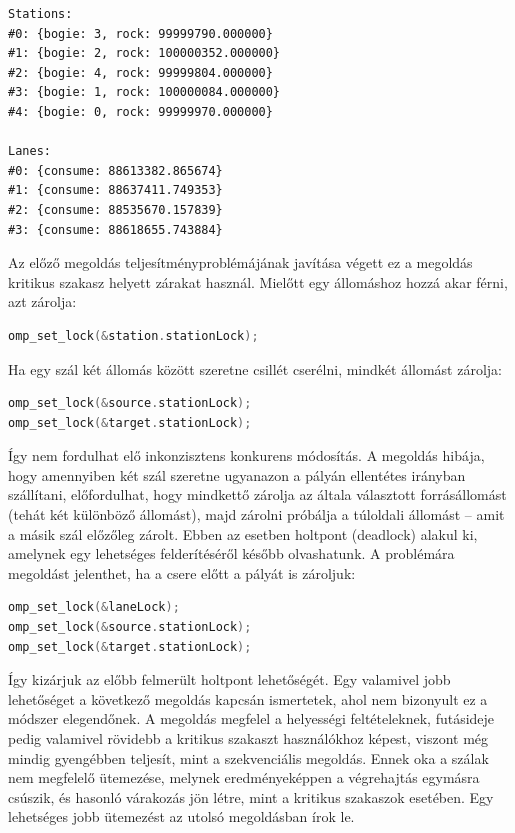 \documentclass[a4paper,10pt]{article}
\begin{document}
\begin{lstlisting}
Stations:
#0: {bogie: 3, rock: 99999790.000000}
#1: {bogie: 2, rock: 100000352.000000}
#2: {bogie: 4, rock: 99999804.000000}
#3: {bogie: 1, rock: 100000084.000000}
#4: {bogie: 0, rock: 99999970.000000}

Lanes:
#0: {consume: 88613382.865674}
#1: {consume: 88637411.749353}
#2: {consume: 88535670.157839}
#3: {consume: 88618655.743884}
\end{lstlisting}

Az előző megoldás teljesítményproblémájának javítása végett ez a megoldás kritikus szakasz helyett zárakat használ. Mielőtt egy állomáshoz hozzá akar férni, azt zárolja:

\begin{lstlisting}[language=c]
omp_set_lock(&station.stationLock);
\end{lstlisting}

Ha egy szál két állomás között szeretne csillét cserélni, mindkét állomást zárolja:

\begin{lstlisting}[language=c]
omp_set_lock(&source.stationLock);
omp_set_lock(&target.stationLock);
\end{lstlisting}

Így nem fordulhat elő inkonzisztens konkurens módosítás. A megoldás hibája, hogy amennyiben két szál szeretne ugyanazon a pályán ellentétes irányban szállítani, előfordulhat, hogy mindkettő zárolja az általa választott forrásállomást (tehát két különböző állomást), majd zárolni próbálja a túloldali állomást -- amit a másik szál előzőleg zárolt. Ebben az esetben holtpont (deadlock) alakul ki, amelynek egy lehetséges felderítéséről később olvashatunk. A problémára megoldást jelenthet, ha a csere előtt a pályát is zároljuk:

\begin{lstlisting}[language=c]
omp_set_lock(&laneLock);
omp_set_lock(&source.stationLock);
omp_set_lock(&target.stationLock);
\end{lstlisting}

Így kizárjuk az előbb felmerült holtpont lehetőségét. Egy valamivel jobb lehetőséget a következő megoldás kapcsán ismertetek, ahol nem bizonyult ez a módszer elegendőnek.
A megoldás megfelel a helyességi feltételeknek, futásideje pedig valamivel rövidebb a kritikus szakaszt használókhoz képest, viszont még mindig gyengébben teljesít, mint a szekvenciális megoldás. Ennek oka a szálak nem megfelelő ütemezése, melynek eredményeképpen a végrehajtás egymásra csúszik, és hasonló várakozás jön létre, mint a kritikus szakaszok esetében. Egy lehetséges jobb ütemezést az utolsó megoldásban írok le.
\end{document}
